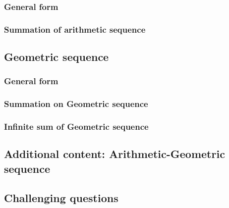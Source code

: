 \documentclass[12pt]{article}
\begin{document}
    \subsubsection{General form}

    \subsubsection{Summation of arithmetic sequence}

    \subsection{Geometric sequence}

    \subsubsection{General form}

    \subsubsection{Summation on Geometric sequence}

    \subsubsection{Infinite sum of Geometric sequence}

    \subsection{Additional content: Arithmetic-Geometric sequence}

    \subsection{Challenging questions}
\end{document}
